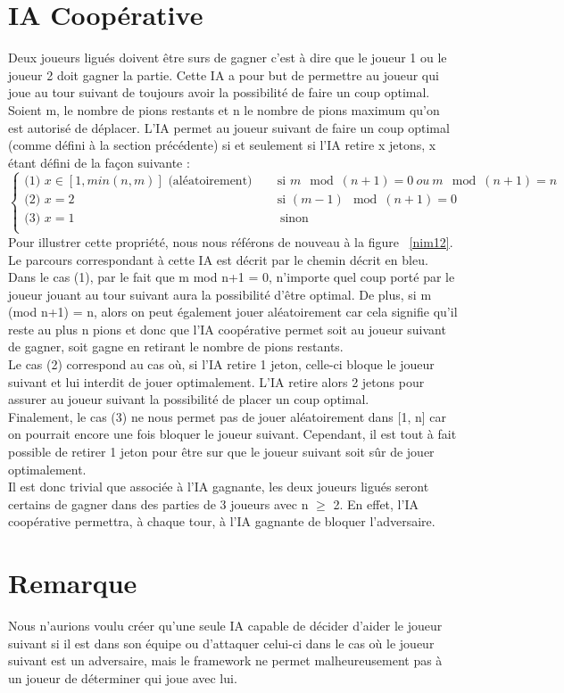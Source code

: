 \documentclass[10pt,a4paper]{article}
\begin{document}
\section{IA Coopérative}
Deux joueurs ligués doivent être surs de gagner c'est à dire que le joueur 1 ou le joueur 2 doit gagner la partie.
Cette IA a pour but de permettre au joueur qui joue au tour suivant de toujours avoir la possibilité de faire un coup optimal.
Soient m, le nombre de pions restants et n le nombre de pions maximum qu'on est autorisé de déplacer. L'IA permet au joueur suivant de faire un coup optimal (comme défini à la section précédente) si et seulement si l'IA retire x jetons, x étant défini de la façon suivante :
\[ \begin{cases}
	\text{(1) } x \in [1, min(n, m)] \text{ (aléatoirement)} \ & \quad \text{si } m \mod (n+1) = 0 \ ou \ m \mod (n+1) = n\\
	\text{(2) } x = 2 & \quad \text{si } (m-1) \mod (n+1) = 0 \\
	\text{(3) } x = 1 &\ \quad \text{sinon }\\
	\end{cases}
\]
Pour illustrer cette propriété, nous nous référons de nouveau à la figure ~\ref{nim12}. Le parcours correspondant à cette IA est décrit par le chemin décrit en {\color{blue} bleu}. \\
Dans le cas (1), par le fait que m mod n+1 = 0, n'importe quel coup porté par le joueur jouant au tour suivant aura la possibilité d'être optimal. De plus, si m (mod n+1) = n, alors on peut également jouer aléatoirement car cela signifie qu'il reste au plus n pions et donc que l'IA coopérative permet soit au joueur suivant de gagner, soit gagne en retirant le nombre de pions restants.\\
Le cas (2) correspond au cas où, si l'IA retire 1 jeton, celle-ci bloque le joueur suivant et lui interdit de jouer optimalement. L'IA retire alors 2 jetons pour assurer au joueur suivant la possibilité de placer un coup optimal.\\
Finalement, le cas (3) ne nous permet pas de jouer aléatoirement dans [1, n] car on pourrait encore une fois bloquer le joueur suivant. Cependant, il est tout à fait possible de retirer 1 jeton pour être sur que le joueur suivant soit sûr de jouer optimalement. \\
Il est donc trivial que associée à l'IA gagnante, les deux joueurs ligués seront certains de gagner dans des parties de 3 joueurs avec n $\geq$ 2.  En effet, l'IA coopérative permettra, à chaque tour, à l'IA gagnante de bloquer l'adversaire.

\section{Remarque}
Nous n'aurions voulu créer qu'une seule IA capable de décider d'aider le joueur suivant si il est dans son équipe ou d'attaquer celui-ci dans le cas où le joueur suivant est un adversaire, mais le framework ne permet malheureusement pas à un joueur de déterminer qui joue avec lui.
\end{document}
